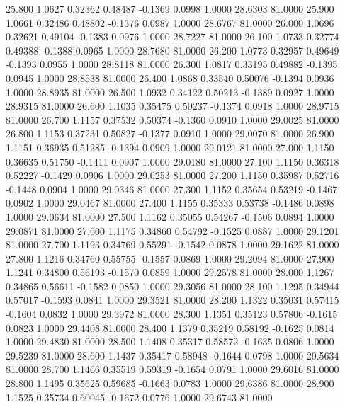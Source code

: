   25.800   1.0627   0.32362   0.48487  -0.1369   0.0998   1.0000  28.6303  81.0000
  25.900   1.0661   0.32486   0.48802  -0.1376   0.0987   1.0000  28.6767  81.0000
  26.000   1.0696   0.32621   0.49104  -0.1383   0.0976   1.0000  28.7227  81.0000
  26.100   1.0733   0.32774   0.49388  -0.1388   0.0965   1.0000  28.7680  81.0000
  26.200   1.0773   0.32957   0.49649  -0.1393   0.0955   1.0000  28.8118  81.0000
  26.300   1.0817   0.33195   0.49882  -0.1395   0.0945   1.0000  28.8538  81.0000
  26.400   1.0868   0.33540   0.50076  -0.1394   0.0936   1.0000  28.8935  81.0000
  26.500   1.0932   0.34122   0.50213  -0.1389   0.0927   1.0000  28.9315  81.0000
  26.600   1.1035   0.35475   0.50237  -0.1374   0.0918   1.0000  28.9715  81.0000
  26.700   1.1157   0.37532   0.50374  -0.1360   0.0910   1.0000  29.0025  81.0000
  26.800   1.1153   0.37231   0.50827  -0.1377   0.0910   1.0000  29.0070  81.0000
  26.900   1.1151   0.36935   0.51285  -0.1394   0.0909   1.0000  29.0121  81.0000
  27.000   1.1150   0.36635   0.51750  -0.1411   0.0907   1.0000  29.0180  81.0000
  27.100   1.1150   0.36318   0.52227  -0.1429   0.0906   1.0000  29.0253  81.0000
  27.200   1.1150   0.35987   0.52716  -0.1448   0.0904   1.0000  29.0346  81.0000
  27.300   1.1152   0.35654   0.53219  -0.1467   0.0902   1.0000  29.0467  81.0000
  27.400   1.1155   0.35333   0.53738  -0.1486   0.0898   1.0000  29.0634  81.0000
  27.500   1.1162   0.35055   0.54267  -0.1506   0.0894   1.0000  29.0871  81.0000
  27.600   1.1175   0.34860   0.54792  -0.1525   0.0887   1.0000  29.1201  81.0000
  27.700   1.1193   0.34769   0.55291  -0.1542   0.0878   1.0000  29.1622  81.0000
  27.800   1.1216   0.34760   0.55755  -0.1557   0.0869   1.0000  29.2094  81.0000
  27.900   1.1241   0.34800   0.56193  -0.1570   0.0859   1.0000  29.2578  81.0000
  28.000   1.1267   0.34865   0.56611  -0.1582   0.0850   1.0000  29.3056  81.0000
  28.100   1.1295   0.34944   0.57017  -0.1593   0.0841   1.0000  29.3521  81.0000
  28.200   1.1322   0.35031   0.57415  -0.1604   0.0832   1.0000  29.3972  81.0000
  28.300   1.1351   0.35123   0.57806  -0.1615   0.0823   1.0000  29.4408  81.0000
  28.400   1.1379   0.35219   0.58192  -0.1625   0.0814   1.0000  29.4830  81.0000
  28.500   1.1408   0.35317   0.58572  -0.1635   0.0806   1.0000  29.5239  81.0000
  28.600   1.1437   0.35417   0.58948  -0.1644   0.0798   1.0000  29.5634  81.0000
  28.700   1.1466   0.35519   0.59319  -0.1654   0.0791   1.0000  29.6016  81.0000
  28.800   1.1495   0.35625   0.59685  -0.1663   0.0783   1.0000  29.6386  81.0000
  28.900   1.1525   0.35734   0.60045  -0.1672   0.0776   1.0000  29.6743  81.0000
